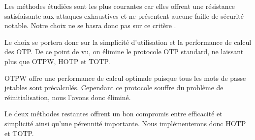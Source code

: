 	Les méthodes étudiées sont les plus courantes car elles offrent une
	résistance satisfaisante aux attaques exhaustives et ne présentent aucune
	faille de sécurité notable. Notre choix ne se basra donc pas sur ce critère
	.

	Le choix se portera donc sur la simplicité d'utilisation et la performance
	de calcul des OTP. De ce point de vu, on élimine le protocole OTP
	standard, ne laissant plus que OTPW, HOTP et TOTP.

	OTPW offre une performance de calcul optimale puisque tous les mots de
	passe jetables sont précalculés. Cependant ce protocole souffre du
	problème de réinitialisation, nous l'avons donc éliminé.

	Le deux méthodes restantes offrent un bon compromis entre efficacité et
	simplicité ainsi qu'une pérennité importante. Nous implémenterons donc HOTP
	et TOTP.

